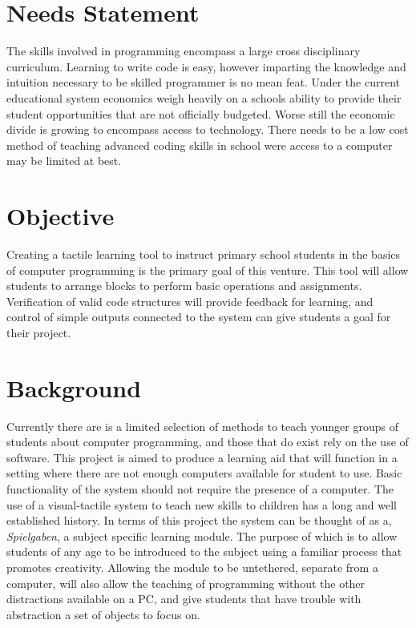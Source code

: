\section{Needs Statement}
The skills involved in programming encompass a large cross disciplinary curriculum. Learning to write code is easy, however imparting the knowledge and intuition necessary to be  skilled programmer is no mean feat. Under the current educational system economics weigh heavily on a schools ability to provide their student opportunities that are not officially budgeted. Worse still the economic divide is growing to encompass access to technology. There needs to be a low cost method of teaching advanced coding skills in school were access to a computer may be limited at best.  
\section{Objective}
Creating a tactile learning tool to instruct primary school students in the basics of computer programming is the primary goal of this venture. This tool will allow students to arrange blocks to perform basic operations and assignments. Verification of valid code structures will provide feedback for learning, and control of simple outputs connected to the system can give students a goal for their project.

\section{Background}

Currently there are is a limited selection of methods to teach younger groups of students about computer programming, and those that do exist rely on the use of software. This project is aimed to produce a learning aid that will function in a setting where there are not enough computers available for student to use. Basic functionality of the system should not require the presence of a computer.
The use of a visual-tactile system to teach new skills to children has a long and well established history. In terms of this project the system can be thought of as a, \textit{Spielgaben}, a subject specific learning module. The purpose of which is to allow students of any age to be introduced to the subject using a familiar process that promotes creativity. Allowing the module to be untethered, separate from a computer, will also allow the teaching of programming without the other distractions available on a PC, and give students that have trouble with abstraction a set of objects to focus on.

